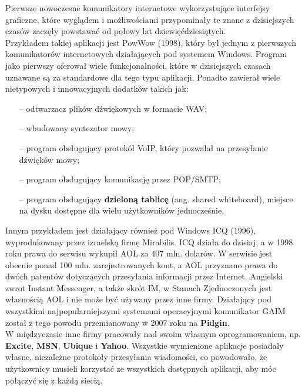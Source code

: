 \documentclass[a4paper,12pt]{article}
\begin{document}
\par Pierwsze nowoczesne komunikatory internetowe wykorzystujące interfejsy graficzne, które wyglądem i możliwościami przypominały te znane z dzisiejszych czasów zaczęły powstawać od połowy lat dziewięćdziesiątych.\\
Przykładem takiej aplikacji jest PowWow (1998), który był jednym z pierwszych komunikatorów internetowych działających pod systemem Windows. Program jako pierwszy oferował wiele funkcjonalności, które w dzisiejszych czasach uznawane są za standardowe dla tego typu aplikacji. Ponadto zawierał wiele nietypowych i innowacyjnych dodatków takich jak:
\begin{itemize}
    \item[--] odtwarzacz plików dźwiękowych w formacie WAV;
    \item[--] wbudowany syntezator mowy;
    \item[--] program obsługujący protokół VoIP, który pozwalał na przesyłanie dźwięków mowy;
    \item[--] program obsługujący komunikację przez POP/SMTP;
    \item[--] program obsługujący \textbf{dzieloną tablicę} (ang. shared whiteboard), miejsce na dysku dostępne dla wielu użytkowników jednocześnie.
\end{itemize}
Innym przykładem jest działający również pod Windows ICQ (1996), wyprodukowany przez izraelską firmę Mirabilis. ICQ działa do dzisiaj, a w 1998 roku prawa do serwisu wykupił AOL za 407 mln. dolarów. W serwisie jest obecnie ponad 100 mln. zarejestrowanych kont, a AOL przyznano prawa do dwóch patentów dotyczących przesyłania informacji przez Internet. Angielski zwrot Instant Messenger, a także skrót IM, w Stanach Zjednoczonych jest własnością AOL i nie może być używany przez inne firmy. Działający pod wszystkimi najpopularniejszymi systemami operacyjnymi komunikator GAIM został z tego powodu przemianowany w 2007 roku na \textbf{Pidgin}.\\
W międzyczasie inne firmy pracowały nad swoim własnym oprogramowaniem, np. \textbf{Excite}, \textbf{MSN}, \textbf{Ubique} i \textbf{Yahoo}.
Wszystkie wymienione aplikacje posiadały własne, niezależne protokoły przesyłania wiadomości, co powodowało, że użytkownicy musieli korzystać ze wszystkich dostępnych aplikacji, aby móc połączyć się z każdą siecią.
\end{document}

